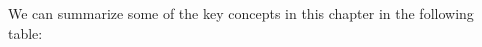         \label{m39373*eip-199}We can summarize some of the key concepts in this chapter in the following table:\par 
    \setlength\mytablespace{8\tabcolsep}
    \addtolength\mytablespace{5\arrayrulewidth}
    \setlength\mytablewidth{\linewidth}
    \setlength\mytableroom{\mytablewidth}
    \addtolength\mytableroom{-\mytablespace}
    \setlength\myfixedwidth{0pt}
    \setlength\mystarwidth{\mytableroom}
        \addtolength\mystarwidth{-\myfixedwidth}
        \divide{}
